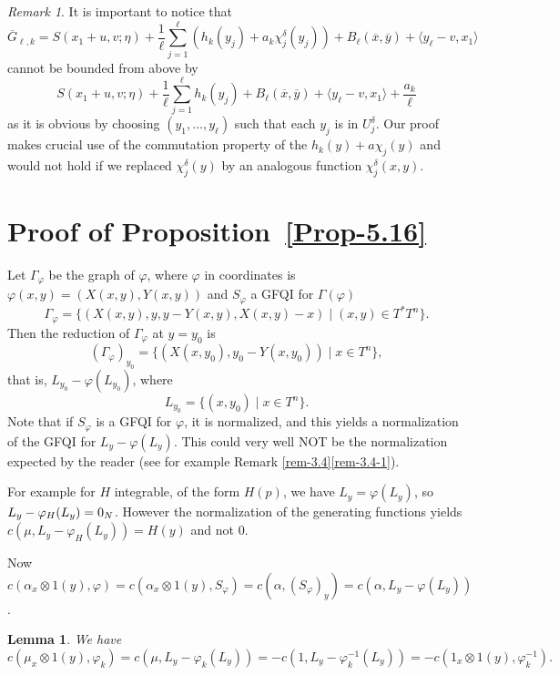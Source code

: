 \documentclass[JEP,XML,SOM,NoFloatCountersInSection,Unicode,published]{cedram}
\numberwithin{equation}{section}
\newcommand{\GFQI}{\textup{GFQI}\xspace}
\theoremstyle{plain}
\newtheorem{lemma}[theorem]{Lemma}
\theoremstyle{definition}
\theoremstyle{remark}
\newtheorem{remark}[theorem]{Remark}
\begin{document}
\begin{remark}

It is important to notice that
\[
\overline G_{\ell, k}=S (x_1+u,v ; \eta)+ \frac{1}{\ell} \sum_{j=1}^{\ell}
\left({h}_{k}(y_{j}) + a_k \chi_{j}^{\delta} (y_{j})\right)
+ B_{\ell} (\overline x,\overline y) + \langle y_{\ell}-v, x_{1} \rangle
\]
cannot be bounded from above by
\[
S (x_1+u,v ; \eta)+ \frac{1}{\ell} \sum_{j=1}^{\ell}
{h}_{k}(y_{j})
+ B_{\ell} (\overline x,\overline y) + \langle y_{\ell}-v, x_{1} \rangle + \frac{a_k}{\ell }
\]
as it is obvious by choosing $(y_{1},\dots, y_{\ell})$ such that each $y_{j}$ is in $U_{j}^{\delta}$.
Our proof makes crucial use of the commutation property of the $h_{k}(y)+a\chi_{j}(y)$ and would not hold if we replaced $\chi_{j}^{\delta}(y)$ by an analogous function $ \chi_{j}^{\delta}(x,y)$.
\end{remark}

\section{Proof of Proposition~\ref{Prop-5.16}}\label{new-section}

Let $\Gamma_{\varphi}$ be the graph of $\varphi$, where $\varphi$ in coordinates is $\varphi(x,y)=(X(x,y),Y(x,y))$ and $S_\varphi$ a \GFQI for $\Gamma(\varphi)$
\[
\Gamma_{\varphi} = \bigl\{ (X(x,y), y, y - Y(x,y), X (x,y) - x) \mid (x,y)\in T^{*}T^{n} \bigr\}.
\]
Then the reduction of $\Gamma_{\varphi}$ at $y = y_{0}$ is
\[
(\Gamma_{\varphi})_{y_{0}} = \bigl\{ (X (x,y_{0}), y_{0} - Y
(x,y_{0})) \mid x \in T^n \bigl\},
\]
that is, $L_{y_{0}} - \varphi(L_{y_{0}})$, where
\[
L_{y_{0}} = \{ (x,y_{0}) \mid x \in T^{n} \}.
\]
Note that if $S_\varphi$ is a \GFQI for $\varphi$, it is normalized, and this yields a normalization of the \GFQI for $L_y-\varphi(L_y)$. This could very well NOT be the normalization expected by the reader (see for example Remark \ref{rem-3.4}\eqref{rem-3.4-1}).

For example for $H$ integrable, of the form $H(p)$, we have $L_y=\varphi(L_y)$, so $L_y-\nobreak \varphi_H(L_y)=0_N$. However the normalization of the generating functions yields $c(\mu, L_y-\varphi_H(L_y))=H(y)$ and not $0$.

Now $c(\alpha_{x} \otimes 1(y),\varphi)=c(\alpha_{x} \otimes 1(y), S_{\varphi})
= c (\alpha, (S_{\varphi})_{y}) = c (\alpha, L_{y} -\varphi(L_{y}))$.

\begin{lemma}
We have
\[
c(\mu_x\otimes1(y),\varphi_k)=c(\mu,L_y-\varphi_k(L_y))=-c(1,L_y-\varphi_k^{-1}(L_y))=-c(1_x\otimes1(y),\varphi_k^{-1}).
\]
\end{lemma}
\end{document}
